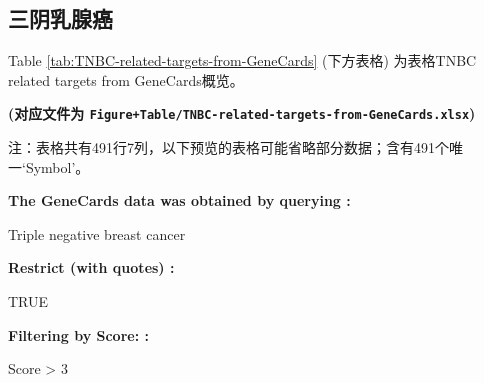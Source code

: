 \documentclass[
]{article}
\begin{document}
\hypertarget{ux4e09ux9634ux4e73ux817aux764c}{%
\subsection{三阴乳腺癌}\label{ux4e09ux9634ux4e73ux817aux764c}}

\begin{center}\vspace{1.5cm}\end{center}

Table \ref{tab:TNBC-related-targets-from-GeneCards} (下方表格) 为表格TNBC related targets from GeneCards概览。

\textbf{(对应文件为 \texttt{Figure+Table/TNBC-related-targets-from-GeneCards.xlsx})}

\begin{center}\begin{tcolorbox}[colback=gray!10, colframe=gray!50, width=0.9\linewidth, arc=1mm, boxrule=0.5pt]注：表格共有491行7列，以下预览的表格可能省略部分数据；含有491个唯一`Symbol'。
\end{tcolorbox}
\end{center}\begin{center}\begin{tcolorbox}[colback=gray!10, colframe=gray!50, width=0.9\linewidth, arc=1mm, boxrule=0.5pt]
\textbf{
The GeneCards data was obtained by querying
:}

\vspace{0.5em}

    Triple negative breast cancer

\vspace{2em}


\textbf{
Restrict (with quotes)
:}

\vspace{0.5em}

    TRUE

\vspace{2em}


\textbf{
Filtering by Score:
:}

\vspace{0.5em}

    Score > 3

\vspace{2em}
\end{tcolorbox}
\end{center}
\end{document}
